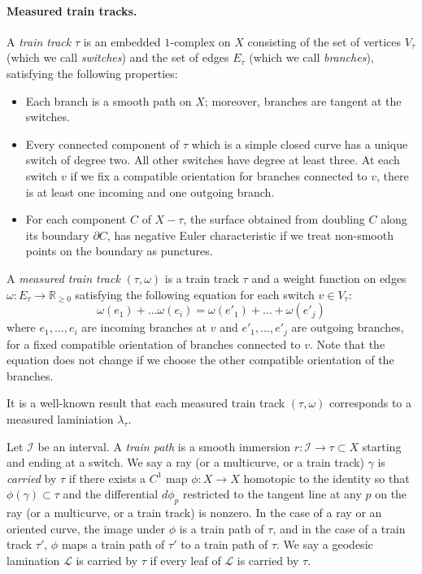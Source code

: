 \documentclass[11pt]{article} %
\theoremstyle{plain}
\theoremstyle{definition}
\numberwithin{equation}{section}
\begin{document}
\paragraph{Measured train tracks.}
A \emph{train track} $\tau$ is an embedded $1$-complex on $X$ consisting of the set of vertices $V_{\tau}$ (which we call \emph{switches}) and the set of edges $E_{\tau}$ (which we call \emph{branches}), satisfying the following properties:
\begin{itemize}[topsep=0mm, itemsep=0mm]
    \item Each branch is a smooth path on $X$; moreover, branches are tangent at the switches.
    \item Every connected component of $\tau$ which is a simple closed curve has a unique switch of degree two. All other switches have degree at least three. At each switch $v$ if we fix a compatible orientation for branches connected to $v$, there is at least one incoming and one outgoing branch.
    \item For each component $C$ of $X-\tau$, the surface obtained from doubling $C$ along its boundary $\partial C$, has negative Euler characteristic if we treat non-smooth points on the boundary as punctures.
\end{itemize}
A \emph{measured train track} $(\tau,\omega)$ is a train track $\tau$ and a weight function on edges $\omega:E_\tau\to\mathbb{R}_{\ge0}$ satisfying the following equation for each switch $v\in V_\tau$:
$$\omega(e_1)+\dots\omega(e_i)=\omega(e'_1)+\dots+\omega(e'_j)$$
where $e_1,\dots,e_i$ are incoming branches at $v$ and $e'_1, \dots, e'_j$ are outgoing branches, for a fixed compatible orientation of branches connected to $v$. Note that the equation does not change if we choose the other compatible orientation of the branches.


It is a well-known result that each measured train track $(\tau,\omega)$ corresponds to a measured laminiation $\lambda_{\tau}.$

Let $\mathcal{I}$ be an interval. A \emph{train path} is a smooth immersion $r:\mathcal{I}\to\tau\subset X$ starting and ending at a switch. We say a ray (or a multicurve, or a train track) $\gamma$ is \emph{carried} by $\tau$ if there exists a $C^1$ map $\phi: X \rightarrow X$ homotopic to the identity so that $\phi(\gamma)\subset\tau$ and the differential $d\phi_p$ restricted to the tangent line at any $p$ on the ray (or a multicurve, or a train track) is nonzero. In the case of a ray or an oriented curve, the image under $\phi$ is a train path of $\tau$, and in the case of a train track $\tau'$, $\phi$ maps a train path of $\tau'$ to a train path of $\tau$. We say a geodesic lamination $\mathcal{L}$ is carried by $\tau$ if every leaf of $\mathcal{L}$ is carried by $\tau$.
\end{document}
